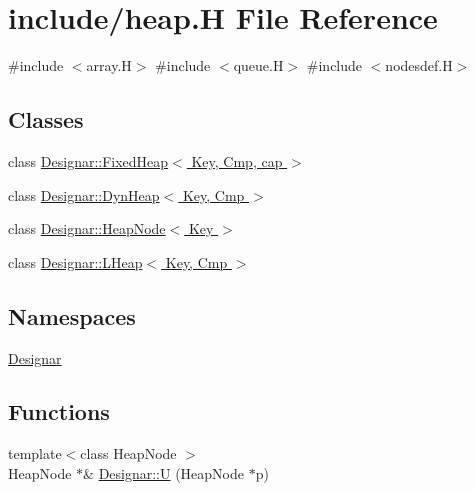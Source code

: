 \hypertarget{heap_8_h}{}\section{include/heap.H File Reference}
\label{heap_8_h}
{\ttfamily \#include $<$array.\+H$>$}\newline
{\ttfamily \#include $<$queue.\+H$>$}\newline
{\ttfamily \#include $<$nodesdef.\+H$>$}\newline
\subsection*{Classes}
\begin{DoxyCompactItemize}
\item 
class \hyperlink{class_designar_1_1_fixed_heap}{Designar\+::\+Fixed\+Heap$<$ Key, Cmp, cap $>$}
\item 
class \hyperlink{class_designar_1_1_dyn_heap}{Designar\+::\+Dyn\+Heap$<$ Key, Cmp $>$}
\item 
class \hyperlink{class_designar_1_1_heap_node}{Designar\+::\+Heap\+Node$<$ Key $>$}
\item 
class \hyperlink{class_designar_1_1_l_heap}{Designar\+::\+L\+Heap$<$ Key, Cmp $>$}
\end{DoxyCompactItemize}
\subsection*{Namespaces}
\begin{DoxyCompactItemize}
\item 
 \hyperlink{namespace_designar}{Designar}
\end{DoxyCompactItemize}
\subsection*{Functions}
\begin{DoxyCompactItemize}
\item 
{\footnotesize template$<$class Heap\+Node $>$ }\\Heap\+Node $\ast$\& \hyperlink{namespace_designar_a67f4b8d103125d6c93110f43f4446187}{Designar\+::U} (Heap\+Node $\ast$p)
\end{DoxyCompactItemize}

